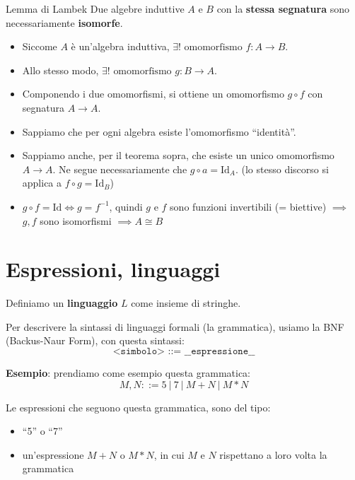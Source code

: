 \documentclass[a4paper,11pt]{report}
\begin{document}
\begin{thmbox}{Lemma di Lambek}{}
    Due algebre induttive \( A \) e \( B \) con la \textbf{stessa segnatura} sono necessariamente \textbf{isomorfe}.

    \begin{proofbox}{}
        \begin{itemize}
            \item Siccome \( A \) è un'algebra induttiva, \( \exists! \text{ omomorfismo } f : A \to B \). 
            \item Allo stesso modo, \( \exists! \text{ omomorfismo } g : B \to A \).
            \item Componendo i due omomorfismi, si ottiene un omomorfismo \( g \circ f \) con segnatura \( A \to A \). 

            \item Sappiamo che per ogni algebra esiste l'omomorfismo ``identità''.
            \item Sappiamo anche, per il teorema sopra, che esiste un unico omomorfismo \( A \to A \). 
                \subitem Ne segue necessariamente che \( g \circ a = \text{Id}_A \). {\small (lo stesso discorso si applica a \( f \circ g = \text{Id}_B \))}

            \item  \( g \circ f = \text{Id} \iff g = f^{-1}\), quindi \( g \) e \( f \) sono funzioni invertibili (= biettive) \( \implies \) \( g, f \) sono isomorfismi \( \implies A \cong B\)  

        \end{itemize}

    \end{proofbox}

\end{thmbox}


\chapter{Espressioni, linguaggi}

Definiamo un \textbf{linguaggio} \( L \) come insieme di stringhe. 

Per descrivere la sintassi di linguaggi formali (la grammatica), usiamo la BNF (Backus-Naur Form), con questa sintassi:
\[
    \texttt{<simbolo> ::= \_\_espressione\_\_}
\]

\textbf{Esempio}:
prendiamo come esempio questa grammatica:
\[
    M, N ::= 5 \ | \ 7 \ | \ M + N \ | \ M * N
\]

Le espressioni che seguono questa grammatica, sono del tipo:
\begin{itemize}
    \item ``5'' o ``7'' 
    \item un'espressione \( M+N \) o \( M*N \), in cui \( M \) e \( N \) rispettano a loro volta la grammatica
\end{itemize}
\end{document}
